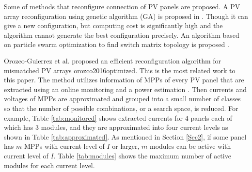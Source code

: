 \documentclass[conference]{IEEEtran}
\begin{document}
Some of methods that reconfigure connection of PV panels are proposed. A PV array reconfiguration using genetic algorithm (GA) is proposed in \cite{carotenuto2015evolutionary}. Though it can give a new configuration, but computing cost is significantly high and the algorithm cannot generate the best configuration precisely.  
An algorithm based on particle swarm optimization to find switch matrix topology is proposed \cite{iraji2017optimisation}. 


Orozco-Guierrez et al. proposed an efficient reconfiguration algorithm
for mismatched PV arrays {orozco2016optimized}. This is the most related work to this paper. 
The method utilizes information of MPPs of every PV panel that are extracted using an online
monitoring \cite{carotenuto2014online} and a power estimation \cite{orozco2015fast}. Then currents and voltages of MPPs are approximated and grouped into a small number of classes so that the number of possible combinations, or a search space, is reduced.
For example, Table \ref{tab:monitored} shows extracted currents for 4 panels each of which has 3 modules, and they are approximated into four current levels as shown in Table \ref{tab:approximated}. As mentioned in Section \ref{Sec2}, if some panel has $m$ MPPs with current level of $I$ or larger, $m$ modules can be active with current level of $I$. 
Table \ref{tab:modules} shows the maximum number of active modules for each current level. 
\end{document}
